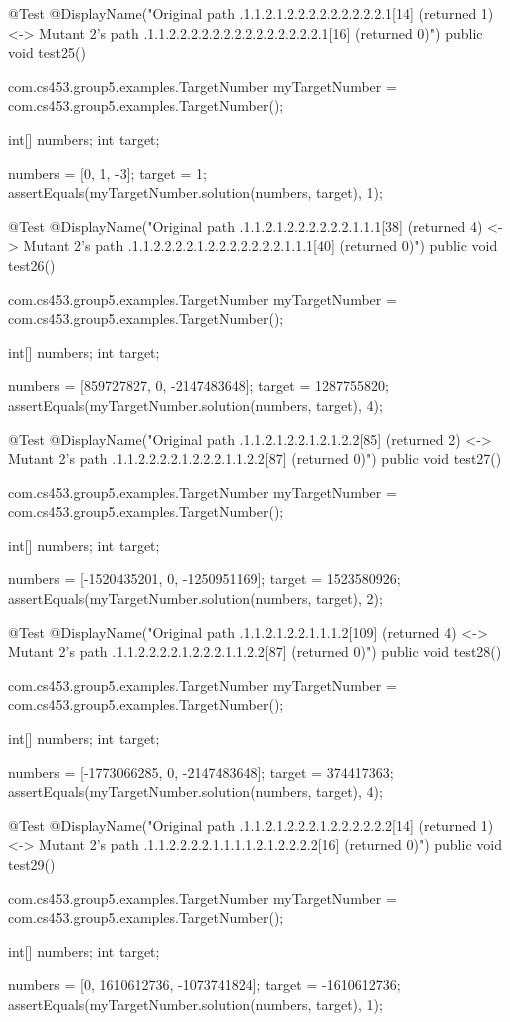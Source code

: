 @Test
@DisplayName("Original path .1.1.2.1.2.2.2.2.2.2.2.2.2.1[14] (returned 1) <-> Mutant 2's path .1.1.2.2.2.2.2.2.2.2.2.2.2.2.2.2.1[16] (returned 0)")
public void test25() {
    com.cs453.group5.examples.TargetNumber myTargetNumber = com.cs453.group5.examples.TargetNumber();

    int[] numbers;
    int target;

    numbers = [0, 1, -3];
    target = 1;
    assertEquals(myTargetNumber.solution(numbers, target), 1);
}

@Test
@DisplayName("Original path .1.1.2.1.2.2.2.2.2.2.1.1.1[38] (returned 4) <-> Mutant 2's path .1.1.2.2.2.2.1.2.2.2.2.2.2.2.1.1.1[40] (returned 0)")
public void test26() {
    com.cs453.group5.examples.TargetNumber myTargetNumber = com.cs453.group5.examples.TargetNumber();

    int[] numbers;
    int target;

    numbers = [859727827, 0, -2147483648];
    target = 1287755820;
    assertEquals(myTargetNumber.solution(numbers, target), 4);
}

@Test
@DisplayName("Original path .1.1.2.1.2.2.1.2.1.2.2[85] (returned 2) <-> Mutant 2's path .1.1.2.2.2.2.1.2.2.2.1.1.2.2[87] (returned 0)")
public void test27() {
    com.cs453.group5.examples.TargetNumber myTargetNumber = com.cs453.group5.examples.TargetNumber();

    int[] numbers;
    int target;

    numbers = [-1520435201, 0, -1250951169];
    target = 1523580926;
    assertEquals(myTargetNumber.solution(numbers, target), 2);
}

@Test
@DisplayName("Original path .1.1.2.1.2.2.1.1.1.2[109] (returned 4) <-> Mutant 2's path .1.1.2.2.2.2.1.2.2.2.1.1.2.2[87] (returned 0)")
public void test28() {
    com.cs453.group5.examples.TargetNumber myTargetNumber = com.cs453.group5.examples.TargetNumber();

    int[] numbers;
    int target;

    numbers = [-1773066285, 0, -2147483648];
    target = 374417363;
    assertEquals(myTargetNumber.solution(numbers, target), 4);
}

@Test
@DisplayName("Original path .1.1.2.1.2.2.2.1.2.2.2.2.2.2[14] (returned 1) <-> Mutant 2's path .1.1.2.2.2.2.1.1.1.1.2.1.2.2.2.2[16] (returned 0)")
public void test29() {
    com.cs453.group5.examples.TargetNumber myTargetNumber = com.cs453.group5.examples.TargetNumber();

    int[] numbers;
    int target;

    numbers = [0, 1610612736, -1073741824];
    target = -1610612736;
    assertEquals(myTargetNumber.solution(numbers, target), 1);
}

